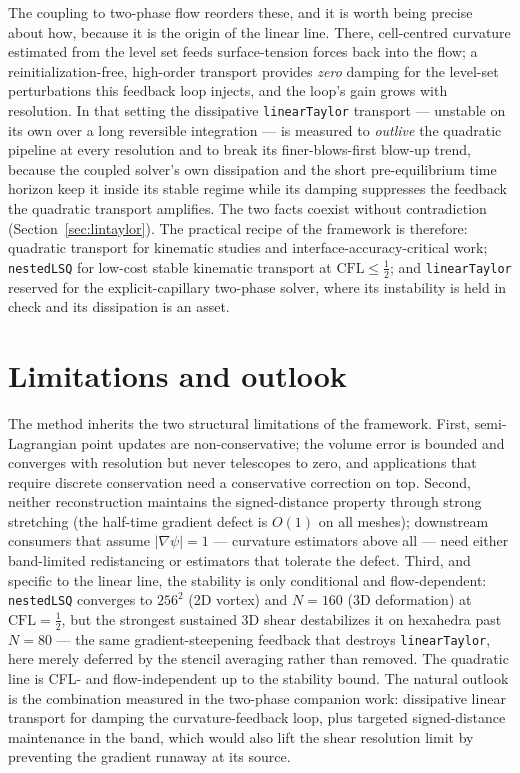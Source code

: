\documentclass[preprint,3p,11pt]{elsarticle}
\newcommand{\psilev}{\psi}
\begin{document}
The coupling to two-phase flow reorders these, and it is worth being precise
about how, because it is the origin of the linear line. There, cell-centred
curvature estimated from the level set feeds surface-tension forces back into
the flow; a reinitialization-free, high-order transport provides \emph{zero}
damping for the level-set perturbations this feedback loop injects, and the
loop's gain grows with resolution. In that setting the dissipative
\texttt{linearTaylor} transport --- unstable on its own over a long reversible
integration --- is measured to \emph{outlive} the quadratic pipeline at every
resolution and to break its finer-blows-first blow-up trend, because the
coupled solver's own dissipation and the short pre-equilibrium time horizon
keep it inside its stable regime while its damping suppresses the feedback the
quadratic transport amplifies. The two facts coexist without contradiction
(Section~\ref{sec:lintaylor}). The practical recipe of the framework is
therefore: quadratic transport for kinematic studies and
interface-accuracy-critical work; \texttt{nestedLSQ} for low-cost stable
kinematic transport at $\mathrm{CFL}\le\tfrac12$; and \texttt{linearTaylor}
reserved for the explicit-capillary two-phase solver, where its instability is
held in check and its dissipation is an asset.

\section{Limitations and outlook}
\label{sec:limitations}
The method inherits the two structural limitations of the framework. First,
semi-Lagrangian point updates are non-conservative; the volume error is
bounded and converges with resolution but never telescopes to zero, and
applications that require discrete conservation need a conservative
correction on top. Second, neither reconstruction maintains the
signed-distance property through strong stretching (the half-time gradient
defect is $O(1)$ on all meshes); downstream consumers that assume
$|\nabla\psilev|=1$ --- curvature estimators above all --- need either
band-limited redistancing or estimators that tolerate the defect. Third, and
specific to the linear line, the stability is only conditional and
flow-dependent: \texttt{nestedLSQ} converges to $256^2$ (2D vortex) and $N=160$
(3D deformation) at $\mathrm{CFL}=\tfrac12$, but the strongest sustained 3D
shear destabilizes it on hexahedra past $N=80$ --- the same gradient-steepening
feedback that destroys \texttt{linearTaylor}, here merely deferred by the
stencil averaging rather than removed. The quadratic line is CFL- and
flow-independent up to the stability bound. The natural outlook is the
combination measured in the two-phase companion work: dissipative linear
transport for damping the curvature-feedback loop, plus targeted
signed-distance maintenance in the band, which would also lift the shear
resolution limit by preventing the gradient runaway at its source.
\end{document}
